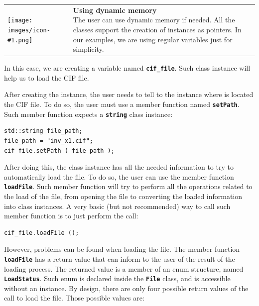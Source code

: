 \documentclass[11pt,twoside,openany,x11names,svgnames]{memoir}
\makeatletter
\newcommand{\IconNote}[3]
{
	\begin{table}[ht]
	\begin{tabular}{ lm{\dimexpr\textwidth-8\tabcolsep-\wd0}@{}}
		\toprule
		\texttt{[image: images/icon-\#1.png]}
		&
		\parbox[t]{155mm}{
		\textbf{#2} \\
		#3
		}
	\end{tabular}
\end{table}
}
\makeatother
\begin{document}
\IconNote
	{info}
	{Using dynamic memory}
	{The user can use dynamic memory if needed. All the classes support the creation of instances as pointers. In our examples, we are using regular variables just for simplicity.}

In this case, we are creating a variable named \textbf{\texttt{cif\_file}}. Such class instance will help us to load the CIF file.

After creating the instance, the user needs to tell to the instance where is located the CIF file. To do so, the user must use a member function named \textbf{\texttt{setPath}}. Such member function expects a \textbf{\texttt{string}} class instance:

\begin{lstlisting}[frame=single,style=CPPStyle]
std::string file_path;
file_path = "inv_x1.cif";
cif_file.setPath ( file_path );
\end{lstlisting}

After doing this, the class instance has all the needed information to try to automatically load the file. To do so, the user can use the member function \textbf{\texttt{loadFile}}. Such member function will try to perform all the operations related to the load of the file, from opening the file to converting the loaded information into class instances. A very basic (but not recommended) way to call such member function is to just perform the call:

\begin{lstlisting}[frame=single,style=CPPStyle]
cif_file.loadFile ();
\end{lstlisting}

However, problems can be found when loading the file. The member function \textbf{\texttt{loadFile}} has a return value that can inform to the user of the result of the loading process. The returned value is a member of an enum structure, named \textbf{\texttt{LoadStatus}}. Such enum is declared inside the \textbf{\texttt{File}} class, and is accessible without an instance. By design, there are only four possible return values of the call to load the file. Those possible values are:
\end{document}

